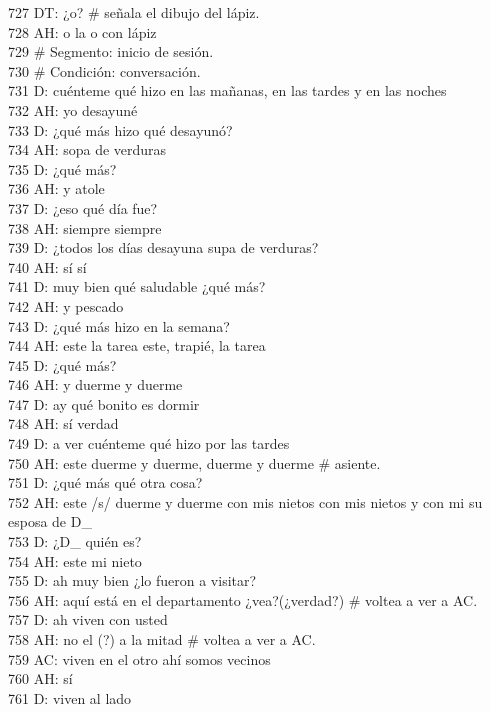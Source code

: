 727 DT: ¿o? # señala el dibujo del lápiz.\\
728 AH: o la o con lápiz\\
729 # Segmento: inicio de sesión.\\
730 # Condición: conversación.\\
731 D: cuénteme qué hizo en las mañanas, en las tardes y en las noches\\
732 AH: yo desayuné\\
733 D: ¿qué más hizo qué desayunó?\\
734 AH: sopa de verduras\\
735 D: ¿qué más?\\
736 AH: y atole\\
737 D: ¿eso qué día fue?\\
738 AH: siempre siempre\\
739 D: ¿todos los días desayuna supa de verduras?\\
740 AH: sí sí\\
741 D: muy bien qué saludable ¿qué más?\\
742 AH: y pescado\\
743 D: ¿qué más hizo en la semana?\\
744 AH: este la tarea este, trapié, la tarea\\
745 D: ¿qué más?\\
746 AH: y duerme y duerme\\
747 D: ay qué bonito es dormir\\
748 AH: sí verdad\\
749 D: a ver cuénteme qué hizo por las tardes\\
750 AH: este duerme y duerme, duerme y duerme # asiente.\\
751 D: ¿qué más qué otra cosa?\\
752 AH: este /s/ duerme y duerme con mis nietos con mis nietos y con mi su esposa de D_\\
753 D: ¿D_ quién es?\\
754 AH: este mi nieto\\
755 D: ah muy bien ¿lo fueron a visitar?\\
756 AH: aquí está en el departamento ¿vea?(¿verdad?) # voltea a ver a AC.\\
757 D: ah viven con usted\\
758 AH: no el (?) a la mitad # voltea a ver a AC.\\
759 AC: viven en el otro ahí somos vecinos\\
760 AH: sí\\
761 D: viven al lado\\
